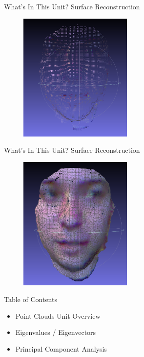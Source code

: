 \documentclass{beamer}
\begin{document}
\begin{frame}{What's In This Unit?}
Surface Reconstruction
\begin{figure}[t]
    \centering
	\includegraphics[width=0.5\textwidth]{PCOriginal.png}
\end{figure}

\end{frame}

\begin{frame}{What's In This Unit?}
Surface Reconstruction
\begin{figure}[t]
    \centering
	\includegraphics[width=0.5\textwidth]{PCReconstructed.png}
\end{figure}

\end{frame}



\begin{frame}{Table of Contents}

\begin{itemize}[label=$\vartriangleright$]
	\item Point Clouds Unit Overview
\end{itemize}
\begin{itemize}[label=$\blacktriangleright$]
	\item Eigenvalues / Eigenvectors
\end{itemize}
\begin{itemize}[label=$\vartriangleright$]
	\item Principal Component Analysis
\end{itemize}

\end{frame}
\end{document}
